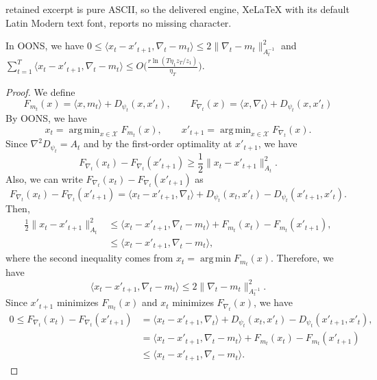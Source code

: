 \documentclass[10pt,a4paper]{amsart}
\DeclareMathOperator*{\argmin}{arg\,min}
\newcommand{\cX}{\mathcal{X}}
\newcommand{\oons}{{\sc OONS}}
\begin{document}
retained excerpt is pure ASCII, so the delivered engine, XeLaTeX with its default Latin Modern text font, reports no missing character.
\begin{lemma}\label{lem:term1}
In \oons, we have 
$0\leq\langle x_{t}-x'_{t+1},\nabla_t-m_t\rangle \leq 2\|\nabla_t-m_t\|_{A_t^{-1}}^2$ and $\sum_{t=1}^T\langle x_{t}-x'_{t+1},\nabla_t-m_t\rangle\leq O\Big(\frac{r\ln(T\eta_1 z_T/z_1)}{\eta_T}\Big)$.
\end{lemma}

\begin{proof}
We define 
\begin{equation*}
F_{m_t}(x)=\langle x,m_t\rangle+D_{\psi_t}(x,x'_t), \qquad F_{\nabla_t}(x)=\langle x,\nabla_t\rangle+D_{\psi_t}(x,x'_t)
\end{equation*}
By \oons, we have
\begin{equation*}
x_t=\argmin_{x\in\cX} F_{m_t}(x), \qquad x'_{t+1}=\argmin_{x\in\cX} F_{\nabla_t}(x).
\end{equation*}
Since $\nabla^2 D_{\psi_t}=A_t$ and by the first-order optimality at $x'_{t+1}$, we have
\begin{equation*}
F_{\nabla_t}(x_t)-F_{\nabla_t}(x'_{t+1})\geq \frac{1}{2}\|x_t-x'_{t+1}\|^2_{A_t}.
\end{equation*}
Also, we can write $F_{\nabla_t}(x_t)-F_{\nabla_t}(x'_{t+1})$ as
\begin{equation*}
F_{\nabla_t}(x_t)-F_{\nabla_t}(x'_{t+1})=\langle x_t-x'_{t+1},\nabla_t\rangle+D_{\psi_t}(x_t,x'_t)-D_{\psi_t}(x'_{t+1},x'_t).
\end{equation*}
Then,
\begin{align*}
\frac{1}{2}\|x_t-x'_{t+1}\|^2_{A_t}&\leq \langle x_t-x'_{t+1},\nabla_t-m_t\rangle+F_{m_t}(x_t)-F_{m_t}(x'_{t+1}),\\
&\leq \langle x_t-x'_{t+1},\nabla_t-m_t\rangle,
\end{align*}
where the second inequality comes from $x_t=\argmin F_{m_t}(x)$.
Therefore, we have
\begin{equation*}\label{eq:part1_1}
\langle x_{t}-x'_{t+1},\nabla_t-m_t\rangle \leq 2\|\nabla_t-m_t\|_{A_t^{-1}}^2.
\end{equation*}
Since $x'_{t+1}$ minimizes $F_{m_t}(x)$ and $x_{t}$ minimizes $F_{\nabla_t}(x)$, we have
\begin{align*}
0\leq F_{\nabla_t}(x_t)-F_{\nabla_t}(x'_{t+1})&=\langle x_t-x'_{t+1},\nabla_t\rangle+D_{\psi_t}(x_t,x'_t)-D_{\psi_t}(x'_{t+1},x'_t),\\
&=\langle x_t-x'_{t+1},\nabla_t-m_t\rangle+F_{m_t}(x_t)-F_{m_t}(x'_{t+1})\\
&\leq \langle x_t-x'_{t+1},\nabla_t-m_t\rangle.
\end{align*}


\end{proof}
\end{document}
